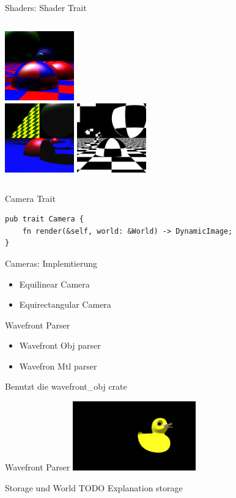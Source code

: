 \documentclass{beamer}
\begin{document}
\begin{frame}{Shaders: Shader Trait}
    \begin{columns}[t]
        \centering
        \includegraphics[height=3cm]{example-true-ambiant} \\
        \includegraphics[height=3cm]{example-mirror}
        \centering
        \includegraphics[height=3cm]{example-mirror2}
    \end{columns}
\end{frame}
\begin{frame}[fragile]{Camera Trait}
    \begin{lstlisting}
pub trait Camera {
    fn render(&self, world: &World) -> DynamicImage;
}
    \end{lstlisting}
\end{frame}
\begin{frame}{Cameras: Implemtierung}
    \begin{itemize}[<+->]
        \item Equilinear Camera
        \item Equirectangular Camera
    \end{itemize}
\end{frame}
\begin{frame}{Wavefront Parser}
    \begin{itemize}[<+->]
        \item Wavefront Obj parser
        \item Wavefron Mtl parser
    \end{itemize}
    Benutzt die wavefront_obj crate
\end{frame}
\begin{frame}{Wavefront Parser}
    \includegraphics[height=3cm]{example-duck}
\end{frame}
\begin{frame}{Storage und World}
    TODO Explanation storage
\end{frame}
\end{document}

